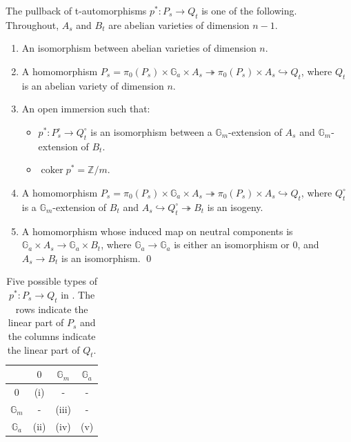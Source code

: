 \documentclass[reqno, letterpaper]{amsart}
\numberwithin{equation}{subsection}
\let\to\longrightarrow
\newcommand{\GG}{\mathbb{G}}
\newcommand{\ZZ}{\mathbb{Z}}
\DeclareMathOperator{\coker}{coker}
\begin{document}
		\begin{lemma} \label{lem:classification of pullback}
			The pullback of t-automorphisms $p^* : P_s \to Q_t$ is one of the following. Throughout, $A_s$ and $B_t$ are abelian varieties of dimension $n-1$.
			\begin{enumerate}[label = \textnormal{(\roman*)}, ref = \roman*]
				\item An isomorphism between abelian varieties of dimension $n$.
				
				\item A homomorphism $P_s = \pi_0(P_s) \times \GG_a \times A_s \twoheadrightarrow \pi_0(P_s) \times A_s \hookrightarrow Q_t$, where $Q_t$ is an abelian variety of dimension $n$.
				
				\item An open immersion such that:
				\begin{itemize}
					\item $p^* : P_s^\circ \to Q_t^\circ$ is an isomorphism between a $\GG_m$-extension of $A_s$ and $\GG_m$-extension of $B_t$.
					\item $\coker p^* = \ZZ/m$.
				\end{itemize}
				
				\item A homomorphism $P_s = \pi_0(P_s) \times \GG_a \times A_s \twoheadrightarrow \pi_0(P_s) \times A_s \hookrightarrow Q_t$, where $Q^\circ_t$ is a $\GG_m$-extension of $B_t$ and $A_s \hookrightarrow Q^\circ_t \twoheadrightarrow B_t$ is an isogeny.
				
				\item A homomorphism whose induced map on neutral components is $\GG_a \times A_s \to \GG_a \times B_t$, where $\GG_a \to \GG_a$ is either an isomorphism or $0$, and $A_s \to B_t$ is an isomorphism. \qed
			\end{enumerate}
		\end{lemma}
		
		\begin{table}[h]
			\begin{tabular}{|c||c|c|c|} \hline
				& $0$ & $\GG_m$ & $\GG_a$ \\ \hline\hline
				$0$ & (i) & - & - \\ \hline
				$\GG_m$ & - & (iii) & - \\ \hline
				$\GG_a$ & (ii) & (iv) & (v) \\ \hline
			\end{tabular}
			\caption{Five possible types of $p^* : P_s \to Q_t$ in . The rows indicate the linear part of $P_s$ and the columns indicate the linear part of $Q_t$.}
			\label{table:comparison of P and Q}
		\end{table}
		
\end{document}
